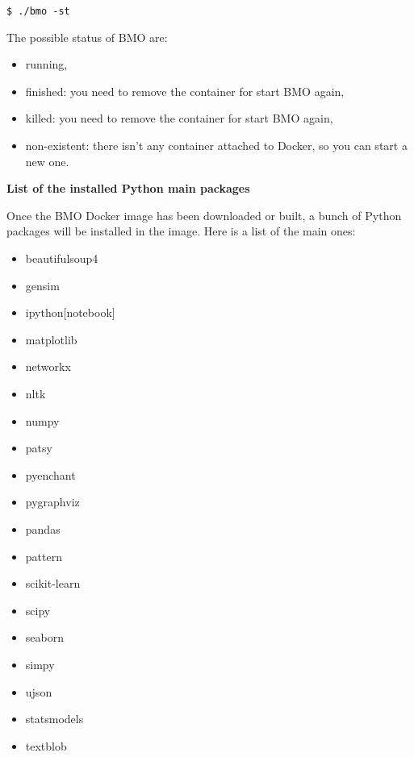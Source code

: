 \vspace*{3mm}
\begin{lstlisting}
$ ./bmo -st
\end{lstlisting}

The possible status of BMO are:


\begin{itemize}
\item[\textbullet]running,
\item[\textbullet]finished: you need to remove the container for start BMO again,
\item[\textbullet]killed: you need to remove the container for start BMO again,
\item[\textbullet]non-existent: there isn't any container attached to Docker, so you can start a new one.
\end{itemize}

\Large
\textbf{List of the installed Python main packages}

\normalsize
Once the BMO Docker image has been downloaded or built, a bunch of Python packages will be installed in the image. Here is a list of the main ones:

\begin{itemize}
\item[\textbullet]beautifulsoup4
\item[\textbullet]gensim
\item[\textbullet]ipython[notebook]
\item[\textbullet]matplotlib
\item[\textbullet]networkx
\item[\textbullet]nltk
\item[\textbullet]numpy
\item[\textbullet]patsy
\item[\textbullet]pyenchant
\item[\textbullet]pygraphviz
\item[\textbullet]pandas
\item[\textbullet]pattern
\item[\textbullet]scikit-learn
\item[\textbullet]scipy
\item[\textbullet]seaborn
\item[\textbullet]simpy
\item[\textbullet]ujson
\item[\textbullet]statsmodels
\item[\textbullet]textblob
\end{itemize}

